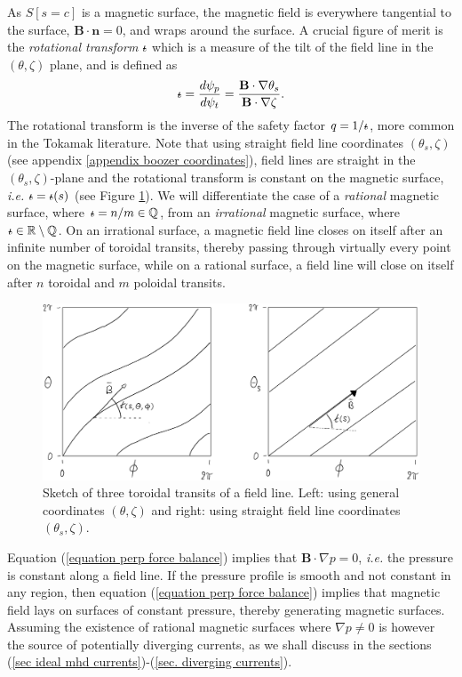 \documentclass[my_thesis.tex]{subfiles}
\begin{document}
As $S[s=c]$ is a magnetic surface, the magnetic field is everywhere tangential to the surface, $\mathbf{B}\cdot\mathbf{n}=0$, and wraps around the surface. A crucial figure of merit is the \emph{rotational transform} $\text{$\iota\!\!$-}$ which is a measure of the tilt of the field line in the $(\theta,\zeta)$ plane, and is defined as
\begin{equation}
	\text{$\iota\!\!$-} = \frac{d\psi_p}{d\psi_t}=\frac{\mathbf{B}\cdot\nabla\theta_s}{\mathbf{B}\cdot\nabla\zeta}.
\end{equation}
The rotational transform is the inverse of the safety factor $q=1/\text{$\iota\!\!$-}$, more common in the Tokamak literature. Note that using straight field line coordinates $(\theta_s,\zeta)$ (see appendix \ref{appendix boozer coordinates}), field lines are straight in the $(\theta_s,\zeta)$-plane and the rotational transform is constant on the magnetic surface, \textit{i.e.} $\text{$\iota\!\!$-}=\text{$\iota\!\!$-}(s)$ (see Figure \ref{fig sketch field line}). We will differentiate the case of a \emph{rational} magnetic surface, where $\text{$\iota\!\!$-}=n/m\in\mathbb{Q}$, from an \emph{irrational} magnetic surface, where $\text{$\iota\!\!$-}\in\mathbb{R}\setminus\mathbb{Q}$. On an irrational surface, a magnetic field line closes on itself after an infinite number of toroidal transits, thereby passing through virtually every point on the magnetic surface, while on a rational surface, a field line will close on itself after $n$ toroidal and $m$ poloidal transits.

\begin{figure}
	\centering
	\includegraphics[width=\linewidth]{images/SketchFieldLine-crop.pdf}
	\caption{Sketch of three toroidal transits of a field line. Left: using general coordinates $(\theta,\zeta)$ and right: using straight field line coordinates $(\theta_s,\zeta)$.}
	\label{fig sketch field line}
\end{figure}

Equation (\ref{equation perp force balance}) implies that $\mathbf{B}\cdot\nabla p=0$, \textit{i.e.} the pressure is constant along a field line. If the pressure profile is smooth and not constant in any region, then equation (\ref{equation perp force balance}) implies that magnetic field lays on surfaces of constant pressure, thereby generating magnetic surfaces. Assuming the existence of rational magnetic surfaces where $\nabla p\neq 0$ is however the source of potentially diverging currents, as we shall discuss in the sections (\ref{sec ideal mhd currents})-(\ref{sec. diverging currents}). 
\end{document}
